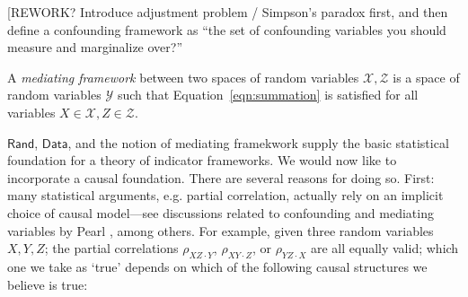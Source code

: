 \documentclass[sigconf]{acmart}
\newcommand{\redout}[1]{{\color{red}#1}}
\newcommand{\Cat}[1]{\mathsf{#1}}
\def\Rand{\Cat{Rand}}
\def\Data{\Cat{Data}}
\begin{document}
\redout{[REWORK? Introduce adjustment problem / Simpson's paradox first, and then define a confounding framework as ``the set of confounding variables you should measure and marginalize over?''}

\begin{definition}
A \emph{mediating framework} between two spaces of random variables $\mathcal{X}, \mathcal{Z}$ is a space of random variables $\mathcal{Y}$ such that Equation~\ref{eqn:summation} is satisfied for all variables $X \in \mathcal{X}, Z \in \mathcal{Z}$. %
\end{definition}



$\Rand$, $\Data$, and the notion of mediating framekwork supply the basic statistical foundation for a theory of indicator frameworks. We would now like to incorporate a causal foundation. There are several reasons for doing so. First: many statistical arguments, e.g. partial correlation, actually rely on an implicit choice of causal model---see discussions related to confounding and mediating variables by Pearl \cite{pearl09}, among others. For example, given three random variables $X, Y, Z$; the partial correlations $\rho_{XZ \cdot Y}$, $\rho_{XY \cdot Z}$, or $\rho_{YZ \cdot X}$ are all equally valid; which one we take as `true' depends on which of the following causal structures we believe is true:
\end{document}
